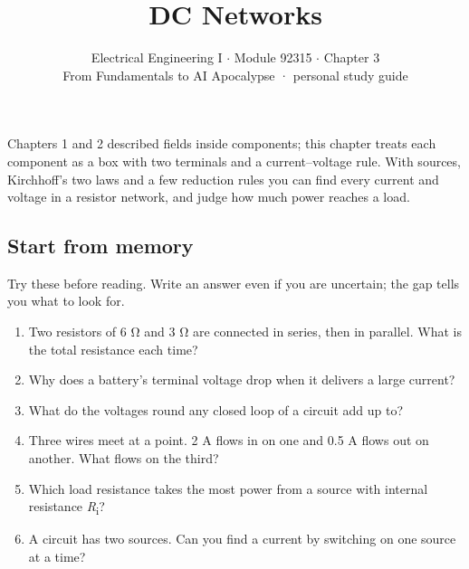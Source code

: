 \documentclass[11pt]{article}
\title{\sffamily\bfseries\color{FAUblue}DC Networks}
\author{Electrical Engineering I \ensuremath{\cdot} Module 92315 \ensuremath{\cdot} Chapter 3\\[2pt]\small From Fundamentals to AI Apocalypse · personal study guide}
\date{}
\begin{document}
\maketitle
\begingroup\footnotesize\setlength{\parskip}{0pt}\tableofcontents\endgroup
\clearpage

{\large Chapters 1 and 2 described fields inside components; this chapter treats each component as a box with two terminals and a current–voltage rule. With sources, Kirchhoff’s two laws and a few reduction rules you can find every current and voltage in a resistor network, and judge how much power reaches a load.}


\begin{keepsection}
\section{Start from memory}

Try these before reading. Write an answer even if you are uncertain; the gap tells you what to look for.

\begin{enumerate}
\item Two resistors of 6 Ω and 3 Ω are connected in series, then in parallel. What is the total resistance each time?
\item Why does a battery’s terminal voltage drop when it delivers a large current?
\item What do the voltages round any closed loop of a circuit add up to?
\item Three wires meet at a point. 2 A flows in on one and 0.5 A flows out on another. What flows on the third?
\item Which load resistance takes the most power from a source with internal resistance \textit{R}\textsubscript{i}?
\item A circuit has two sources. Can you find a current by switching on one source at a time?
\end{enumerate}

\end{keepsection}
\end{document}
